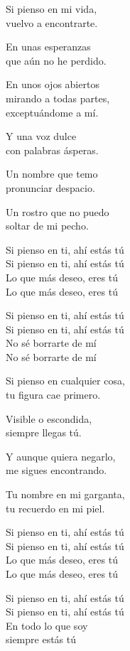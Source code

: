 \begin{lyrics}
Si pienso en mi vida,\\
vuelvo a encontrarte.

En unas esperanzas\\
que aún no he perdido.

En unos ojos abiertos\\
mirando a todas partes,\\
exceptuándome a mí.

Y una voz dulce\\
con palabras ásperas.

Un nombre que temo\\
pronunciar despacio.

Un rostro que no puedo\\
soltar de mi pecho.

Si pienso en ti, ahí estás tú\\
Si pienso en ti, ahí estás tú\\
Lo que más deseo, eres tú\\
Lo que más deseo, eres tú

Si pienso en ti, ahí estás tú\\
Si pienso en ti, ahí estás tú\\
No sé borrarte de mí\\
No sé borrarte de mí

Si pienso en cualquier cosa,\\
tu figura cae primero.

Visible o escondida,\\
siempre llegas tú.

Y aunque quiera negarlo,\\
me sigues encontrando.

Tu nombre en mi garganta,\\
tu recuerdo en mi piel.

Si pienso en ti, ahí estás tú\\
Si pienso en ti, ahí estás tú\\
Lo que más deseo, eres tú\\
Lo que más deseo, eres tú

Si pienso en ti, ahí estás tú\\
Si pienso en ti, ahí estás tú\\
En todo lo que soy\\
siempre estás tú
\end{lyrics}

